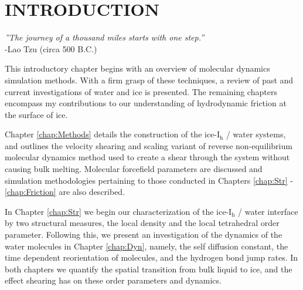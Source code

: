 \chapter{INTRODUCTION}\label{chap:intro}
%
%
%
%
%
%



\begin{flushright}
\textit{''The journey of a thousand miles starts with one step.''} \\
-Lao Tzu (circa 500 B.C.) \\
\end{flushright}

This introductory chapter begins with an overview of molecular
dynamics simulation methods. With a firm grasp of these techniques, a
review of past and current investigations of water and ice is
presented. The remaining chapters encompass my contributions to our
understanding of hydrodynamic friction at the surface of ice.

Chapter \ref{chap:Methods} details the construction of the
ice-I$_\mathrm{h}$ / water systems, and outlines the velocity shearing
and scaling variant of reverse non-equilibrium molecular dynamics
method used to create a shear through the system without causing bulk
melting. Molecular forcefield parameters are discussed and simulation
methodologies pertaining to those conducted in Chapters
\ref{chap:Str} - \ref{chap:Friction} are also described.

In Chapter \ref{chap:Str} we begin our characterization of the
ice-I$_\mathrm{h}$ / water interface by two structural measures, the
local density and the local tetrahedral order parameter. Following
this, we present an investigation of the dynamics of the water
molecules in Chapter \ref{chap:Dyn}, namely, the self diffusion
constant, the time dependent reorientation of molecules, and the
hydrogen bond jump rates. In both chapters we quantify the spatial
transition from bulk liquid to ice, and the effect shearing has
on these order parameters and dynamics.

